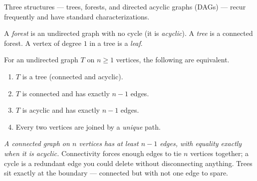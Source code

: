 Three structures --- trees, forests, and directed acyclic graphs (DAGs) --- recur frequently and have standard characterizations.

\begin{definition}
\label{ch01:def-tree}
A \emph{forest} is an undirected graph with no cycle (it is \emph{acyclic}). A
\emph{tree} is a connected forest. A vertex of degree $1$ in a tree is a
\emph{leaf}.
\end{definition}

\begin{theorem}
\label{ch01:tree-equiv}
For an undirected graph $T$ on $n \ge 1$ vertices, the following are equivalent.
\begin{enumerate}[label=\textup{(\roman*)}]
  \item $T$ is a tree (connected and acyclic).
  \item $T$ is connected and has exactly $n-1$ edges.
  \item $T$ is acyclic and has exactly $n-1$ edges.
  \item Every two vertices are joined by a \emph{unique} path.
\end{enumerate}
\end{theorem}

\begin{whybox}
\emph{A connected graph on $n$ vertices has at least $n-1$ edges, with equality exactly when it is acyclic.} Connectivity forces enough
edges to tie $n$ vertices together; a cycle is a redundant edge you could delete
without disconnecting anything. Trees sit exactly at the boundary --- connected
but with not one edge to spare.
\end{whybox}

